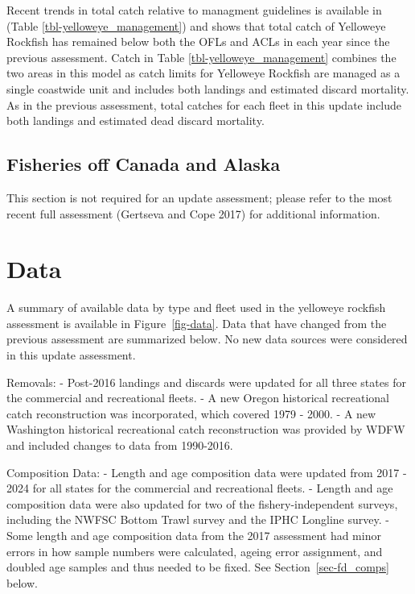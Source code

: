 \documentclass[
]{scrartcl}
\begin{document}
Recent trends in total catch relative to managment guidelines is
available in (Table \ref{tbl-yelloweye_management}) and shows that total
catch of Yelloweye Rockfish has remained below both the OFLs and ACLs in
each year since the previous assessment. Catch in Table
\ref{tbl-yelloweye_management} combines the two areas in this model as
catch limits for Yelloweye Rockfish are managed as a single coastwide
unit and includes both landings and estimated discard mortality. As in
the previous assessment, total catches for each fleet in this update
include both landings and estimated dead discard mortality.

\subsection{Fisheries off Canada and
Alaska}\label{fisheries-off-canada-and-alaska}

This section is not required for an update assessment; please refer to
the most recent full assessment (Gertseva and Cope 2017) for additional
information.

\newpage{}

\section{Data}\label{data}

A summary of available data by type and fleet used in the yelloweye
rockfish assessment is available in Figure~\ref{fig-data}. Data that
have changed from the previous assessment are summarized below. No new
data sources were considered in this update assessment.

Removals: - Post-2016 landings and discards were updated for all three
states for the commercial and recreational fleets. - A new Oregon
historical recreational catch reconstruction was incorporated, which
covered 1979 - 2000. - A new Washington historical recreational catch
reconstruction was provided by WDFW and included changes to data from
1990-2016.

Composition Data: - Length and age composition data were updated from
2017 - 2024 for all states for the commercial and recreational fleets. -
Length and age composition data were also updated for two of the
fishery-independent surveys, including the NWFSC Bottom Trawl survey and
the IPHC Longline survey. - Some length and age composition data from
the 2017 assessment had minor errors in how sample numbers were
calculated, ageing error assignment, and doubled age samples and thus
needed to be fixed. See Section~\ref{sec-fd_comps} below.
\end{document}
